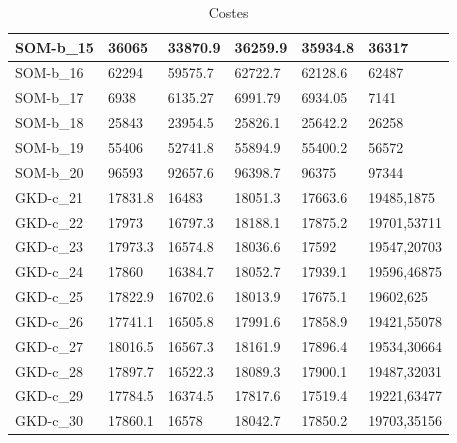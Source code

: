 \documentclass[11pt,a4paper]{article}
\begin{document}
\begin{table}[H]
\begin{tabular}{l|l|l|l|l|l|}
			\multicolumn{1}{|l|}{SOM-b\_15} & 36065            & 33870.9        & 36259.9         & 35934.8     & 36317             \\ \hline
			\multicolumn{1}{|l|}{SOM-b\_16} & 62294            & 59575.7        & 62722.7         & 62128.6     & 62487             \\ \hline
			\multicolumn{1}{|l|}{SOM-b\_17} & 6938             & 6135.27        & 6991.79         & 6934.05     & 7141              \\ \hline
			\multicolumn{1}{|l|}{SOM-b\_18} & 25843            & 23954.5        & 25826.1         & 25642.2     & 26258             \\ \hline
			\multicolumn{1}{|l|}{SOM-b\_19} & 55406            & 52741.8        & 55894.9         & 55400.2     & 56572             \\ \hline
			\multicolumn{1}{|l|}{SOM-b\_20} & 96593            & 92657.6        & 96398.7         & 96375       & 97344             \\ \hline
			\multicolumn{1}{|l|}{GKD-c\_21} & 17831.8          & 16483          & 18051.3         & 17663.6     & 19485,1875        \\ \hline
			\multicolumn{1}{|l|}{GKD-c\_22} & 17973            & 16797.3        & 18188.1         & 17875.2     & 19701,53711       \\ \hline
			\multicolumn{1}{|l|}{GKD-c\_23} & 17973.3          & 16574.8        & 18036.6         & 17592       & 19547,20703       \\ \hline
			\multicolumn{1}{|l|}{GKD-c\_24} & 17860            & 16384.7        & 18052.7         & 17939.1     & 19596,46875       \\ \hline
			\multicolumn{1}{|l|}{GKD-c\_25} & 17822.9          & 16702.6        & 18013.9         & 17675.1     & 19602,625         \\ \hline
			\multicolumn{1}{|l|}{GKD-c\_26} & 17741.1          & 16505.8        & 17991.6         & 17858.9     & 19421,55078       \\ \hline
			\multicolumn{1}{|l|}{GKD-c\_27} & 18016.5          & 16567.3        & 18161.9         & 17896.4     & 19534,30664       \\ \hline
			\multicolumn{1}{|l|}{GKD-c\_28} & 17897.7          & 16522.3        & 18089.3         & 17900.1     & 19487,32031       \\ \hline
			\multicolumn{1}{|l|}{GKD-c\_29} & 17784.5          & 16374.5        & 17817.6         & 17519.4     & 19221,63477       \\ \hline
			\multicolumn{1}{|l|}{GKD-c\_30} & 17860.1          & 16578          & 18042.7         & 17850.2     & 19703,35156       \\ \hline
		\end{tabular}
		\caption{ Costes }
		\label{costes}
	\end{table}
\end{document}
